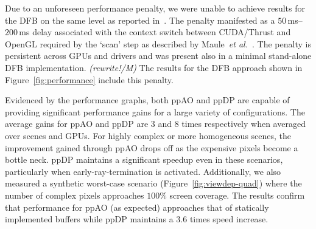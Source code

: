 \documentclass{egpubl}
\def\etal{\emph{et al.}}
\newcommand{\todo}[1]{{\color{red}\emph{(#1)}}}
\newcommand{\stencil}{ppAO}
\newcommand{\dloop}{ppDP}
\begin{document}
Due to an unforeseen performance penalty, we were unable to achieve results for the DFB on the same level as reported in~\cite{Maule2012}. 
The penalty manifested as a $50\,$ms--$200\,$ms delay associated with the context switch between CUDA/Thrust and OpenGL required by the `scan' step as described by Maule~\etal{}~\cite{Maule2012}. 
The penalty is persistent across GPUs and drivers and was present also in a minimal stand-alone DFB implementation. \todo{rewrite!/M}
The results for the DFB approach shown in Figure~\ref{fig:performance} include this penalty.

Evidenced by the performance graphs, both \stencil{} and \dloop{} are capable of providing significant performance gains for a large variety of configurations. 
The average gains for \stencil{} and \dloop{} are $3$ and $8$ times respectively when averaged over scenes and GPUs. %
For highly complex or more homogeneous scenes, the improvement gained through \stencil{} drops off as the expensive pixels become a bottle neck. 
\dloop{} maintains a significant speedup even in these scenarios, particularly when early-ray-termination is activated. 
Additionally, we also measured a synthetic worst-case scenario (Figure~\ref{fig:viewdep-quad}) where the number of complex pixels approaches $100\%$ screen coverage. 
The results confirm that performance for \stencil{} (as expected) approaches that of statically implemented buffers while \dloop{} maintains a $3.6$ times speed increase. 
\end{document}
